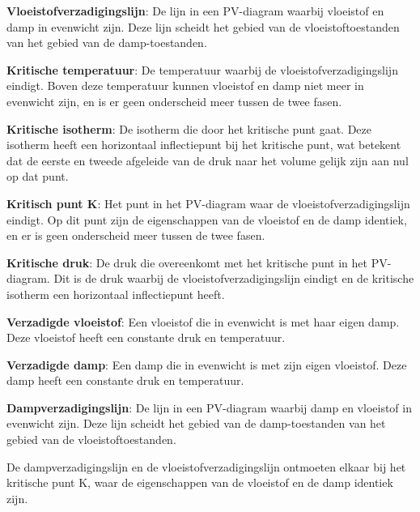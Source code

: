 \begin{definition}
    \textbf{Vloeistofverzadigingslijn}: De lijn in een PV-diagram waarbij vloeistof en damp in evenwicht zijn. Deze lijn scheidt het gebied van de vloeistoftoestanden van het gebied van de damp-toestanden.
\end{definition}
\medskip
\begin{definition}
    \textbf{Kritische temperatuur}: De temperatuur waarbij de vloeistofverzadigingslijn eindigt. Boven deze temperatuur kunnen vloeistof en damp niet meer in evenwicht zijn, en is er geen onderscheid meer tussen de twee fasen.
\end{definition}
\medskip
\begin{definition}
    \textbf{Kritische isotherm}: De isotherm die door het kritische punt gaat. Deze isotherm heeft een horizontaal inflectiepunt bij het kritische punt, wat betekent dat de eerste en tweede afgeleide van de druk naar het volume gelijk zijn aan nul op dat punt.
\end{definition}
\medskip
\begin{definition}
    \textbf{Kritisch punt K}: Het punt in het PV-diagram waar de vloeistofverzadigingslijn eindigt. Op dit punt zijn de eigenschappen van de vloeistof en de damp identiek, en er is geen onderscheid meer tussen de twee fasen.
\end{definition}
\medskip
\begin{definition}
    \textbf{Kritische druk}: De druk die overeenkomt met het kritische punt in het PV-diagram. Dit is de druk waarbij de vloeistofverzadigingslijn eindigt en de kritische isotherm een horizontaal inflectiepunt heeft.
\end{definition}
\medskip
\begin{definition}
    \textbf{Verzadigde vloeistof}: Een vloeistof die in evenwicht is met haar eigen damp. Deze vloeistof heeft een constante druk en temperatuur.
\end{definition}
\medskip
\begin{definition}
    \textbf{Verzadigde damp}: Een damp die in evenwicht is met zijn eigen vloeistof. Deze damp heeft een constante druk en temperatuur.
\end{definition}
\medskip
\begin{definition}
    \textbf{Dampverzadigingslijn}: De lijn in een PV-diagram waarbij damp en vloeistof in evenwicht zijn. Deze lijn scheidt het gebied van de damp-toestanden van het gebied van de vloeistoftoestanden.
\end{definition}
\medskip
De dampverzadigingslijn en de vloeistofverzadigingslijn ontmoeten elkaar bij het kritische punt K, waar de eigenschappen van de vloeistof en de damp identiek zijn.


